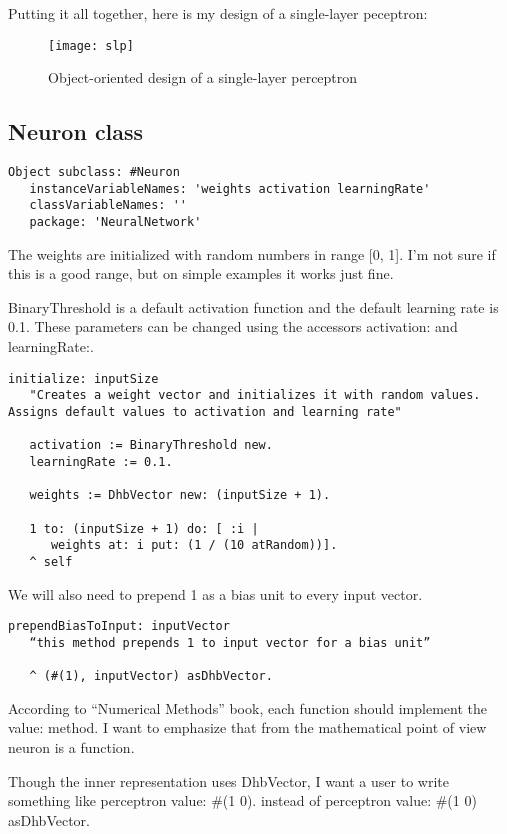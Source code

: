 Putting it all together, here is my design of a single-layer peceptron:

\begin{figure}[H]
  \centering
  \texttt{[image: slp]}
  \caption{Object-oriented design of a single-layer perceptron}
  \label{fig:slp2}
\end{figure}

\subsection{Neuron class}
\begin{lstlisting}
Object subclass: #Neuron
   instanceVariableNames: 'weights activation learningRate'
   classVariableNames: ''
   package: 'NeuralNetwork'
\end{lstlisting}

The weights are initialized with random numbers in range [0, 1]. I’m not sure if this is a good range, but on simple examples it works just fine.

BinaryThreshold is a default activation function and the default learning rate is 0.1. These parameters can be changed using the accessors activation: and learningRate:.

\begin{lstlisting}
initialize: inputSize
   "Creates a weight vector and initializes it with random values. Assigns default values to activation and learning rate"

   activation := BinaryThreshold new.
   learningRate := 0.1.
 
   weights := DhbVector new: (inputSize + 1).
 
   1 to: (inputSize + 1) do: [ :i |
      weights at: i put: (1 / (10 atRandom))].
   ^ self
\end{lstlisting}

We will also need to prepend 1 as a bias unit to every input vector.

\begin{lstlisting}
prependBiasToInput: inputVector
   “this method prepends 1 to input vector for a bias unit”
 
   ^ (#(1), inputVector) asDhbVector.
\end{lstlisting}

According to “Numerical Methods” book, each function should implement the value: method. I want to emphasize that from the mathematical point of view neuron is a function.

Though the inner representation uses DhbVector, I want a user to write something like perceptron value: \#(1 0). instead of perceptron value: \#(1 0) asDhbVector.

